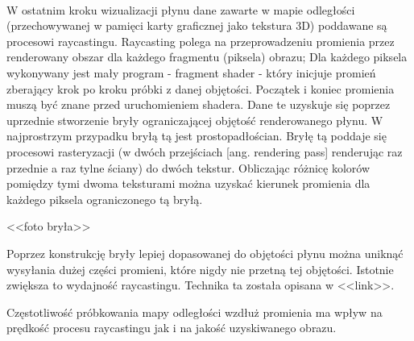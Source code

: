 \paragraph{}
W ostatnim kroku wizualizacji płynu dane zawarte w mapie odległości (przechowywanej w pamięci karty graficznej jako tekstura 3D) poddawane są procesowi raycastingu. Raycasting polega na przeprowadzeniu promienia przez renderowany obszar dla każdego fragmentu (piksela) obrazu; Dla każdego piksela wykonywany jest mały program - fragment shader - który inicjuje promień zberający krok po kroku próbki z danej objętości. Początek i koniec promienia muszą być znane przed uruchomieniem shadera. Dane te uzyskuje się poprzez uprzednie stworzenie bryły ograniczającej objętość renderowanego płynu. W najprostrzym przypadku bryłą tą jest prostopadłościan. Bryłę tą poddaje się procesowi rasteryzacji (w dwóch przejściach [ang. rendering pass] renderując raz przednie a raz tylne ściany) do dwóch tekstur. Obliczając różnicę kolorów pomiędzy tymi dwoma teksturami można uzyskać kierunek promienia dla każdego piksela ograniczonego tą bryłą.
\par
<<foto bryła>>
\par
Poprzez konstrukcję bryły lepiej dopasowanej do objętości płynu można uniknąć wysyłania dużej części promieni, które nigdy nie przetną tej objętości. Istotnie zwiększa to wydajność raycastingu. Technika ta została opisana w <<link>>.
\par
Częstotliwość próbkowania mapy odległości wzdłuż promienia ma wpływ na prędkość procesu raycastingu jak i na jakość uzyskiwanego obrazu.
\par